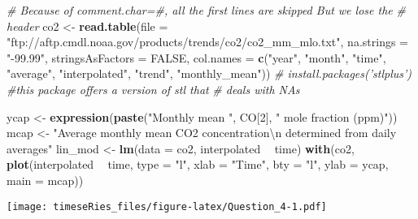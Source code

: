 \documentclass[]{book}
\newenvironment{Shaded}{\begin{snugshade}}{\end{snugshade}}
\newcommand{\KeywordTok}[1]{\textcolor[rgb]{0.13,0.29,0.53}{\textbf{#1}}}
\newcommand{\DataTypeTok}[1]{\textcolor[rgb]{0.13,0.29,0.53}{#1}}
\newcommand{\DecValTok}[1]{\textcolor[rgb]{0.00,0.00,0.81}{#1}}
\newcommand{\CharTok}[1]{\textcolor[rgb]{0.31,0.60,0.02}{#1}}
\newcommand{\StringTok}[1]{\textcolor[rgb]{0.31,0.60,0.02}{#1}}
\newcommand{\CommentTok}[1]{\textcolor[rgb]{0.56,0.35,0.01}{\textit{#1}}}
\newcommand{\OtherTok}[1]{\textcolor[rgb]{0.56,0.35,0.01}{#1}}
\newcommand{\OperatorTok}[1]{\textcolor[rgb]{0.81,0.36,0.00}{\textbf{#1}}}
\newcommand{\NormalTok}[1]{#1}
\begin{document}
\begin{Shaded}
\begin{Highlighting}[]
\CommentTok{# Because of comment.char=#, all the first lines are skipped But we lose the}
\CommentTok{# header}
\NormalTok{co2 <-}\StringTok{ }\KeywordTok{read.table}\NormalTok{(}\DataTypeTok{file =} \StringTok{"ftp://aftp.cmdl.noaa.gov/products/trends/co2/co2_mm_mlo.txt"}\NormalTok{, }
    \DataTypeTok{na.strings =} \StringTok{"-99.99"}\NormalTok{, }\DataTypeTok{stringsAsFactors =} \OtherTok{FALSE}\NormalTok{, }\DataTypeTok{col.names =} \KeywordTok{c}\NormalTok{(}\StringTok{"year"}\NormalTok{, }\StringTok{"month"}\NormalTok{, }
        \StringTok{"time"}\NormalTok{, }\StringTok{"average"}\NormalTok{, }\StringTok{"interpolated"}\NormalTok{, }\StringTok{"trend"}\NormalTok{, }\StringTok{"monthly_mean"}\NormalTok{))}
\CommentTok{# install.packages('stlplus') #this package offers a version of stl that}
\CommentTok{# deals with NAs}

\NormalTok{ycap <-}\StringTok{ }\KeywordTok{expression}\NormalTok{(}\KeywordTok{paste}\NormalTok{(}\StringTok{"Monthly mean "}\NormalTok{, CO[}\DecValTok{2}\NormalTok{], }\StringTok{" mole fraction (ppm)"}\NormalTok{))}
\NormalTok{mcap <-}\StringTok{ "Average monthly mean CO2 concentration}\CharTok{\textbackslash{}n}\StringTok{ determined from daily averages"}
\NormalTok{lin_mod <-}\StringTok{ }\KeywordTok{lm}\NormalTok{(}\DataTypeTok{data =}\NormalTok{ co2, interpolated }\OperatorTok{~}\StringTok{ }\NormalTok{time)}
\KeywordTok{with}\NormalTok{(co2, }\KeywordTok{plot}\NormalTok{(interpolated }\OperatorTok{~}\StringTok{ }\NormalTok{time, }\DataTypeTok{type =} \StringTok{"l"}\NormalTok{, }\DataTypeTok{xlab =} \StringTok{"Time"}\NormalTok{, }\DataTypeTok{bty =} \StringTok{"l"}\NormalTok{, }\DataTypeTok{ylab =}\NormalTok{ ycap, }
    \DataTypeTok{main =}\NormalTok{ mcap))}
\end{Highlighting}
\end{Shaded}

\texttt{[image: timeseRies\_files/figure-latex/Question\_4-1.pdf]}

\begin{Shaded}
\end{Shaded}
\end{document}
